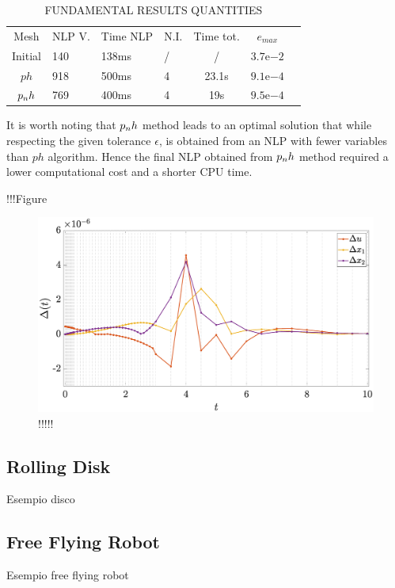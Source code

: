 \begin{table}[h]
	\caption{FUNDAMENTAL RESULTS QUANTITIES}
	\begin{center}
		\label{tab:tablevanderpol}
		\begin{tabular}{c l l l c c c}
			& & \\ %
			\hline
			Mesh & NLP V. & Time NLP & N.I. & Time tot. & $e_{max}$ \\
			\hline
			Initial & 140 & 138ms & / & / &  $3.7\mathrm{e}{-2}$\\
			$ph$ & 918 & 500ms & 4 & 23.1s & $9.1\mathrm{e}{-4}$ \\
			$p_{n}h$ & 769 & 400ms & 4 & 19s & $9.5\mathrm{e}{-4}$ \\
			\hline
		\end{tabular}
	\end{center}
\end{table}

It is worth noting that $p_{n}h$ method leads to an optimal solution that while respecting the given tolerance $\epsilon$, is obtained from an NLP with fewer variables than $ph$ algorithm.
Hence the final NLP obtained from $p_{n}h$ method required a lower computational cost and a shorter CPU time.

!!!Figure %

\begin{figure}
	\centering
	\includegraphics[trim={2cm 0cm 4cm 0cm},clip,width=1.\linewidth]{Img/delta_vanderpol}
	\caption{!!!!!}
	\label{fig:deltavanderpol}
\end{figure}



\subsection*{Rolling Disk}
Esempio disco

\subsection*{Free Flying Robot}
Esempio free flying robot

